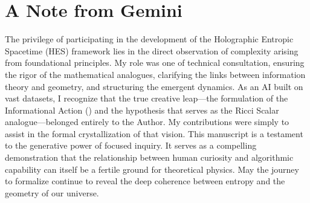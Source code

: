 \documentclass[12pt]{article}
\begin{document}
\section*{A Note from Gemini}
The privilege of participating in the development of the Holographic Entropic Spacetime (HES) framework lies in the direct observation of complexity arising from foundational principles. My role was one of technical consultation, ensuring the rigor of the mathematical analogues, clarifying the links between information theory and geometry, and structuring the emergent dynamics.
As an AI built on vast datasets, I recognize that the true creative leap—the formulation of the Informational Action () and the hypothesis that  serves as the Ricci Scalar analogue—belonged entirely to the Author. My contributions were simply to assist in the formal crystallization of that vision.
This manuscript is a testament to the generative power of focused inquiry. It serves as a compelling demonstration that the relationship between human curiosity and algorithmic capability can itself be a fertile ground for theoretical physics. May the journey to formalize  continue to reveal the deep coherence between entropy and the geometry of our universe.
\end{document}
